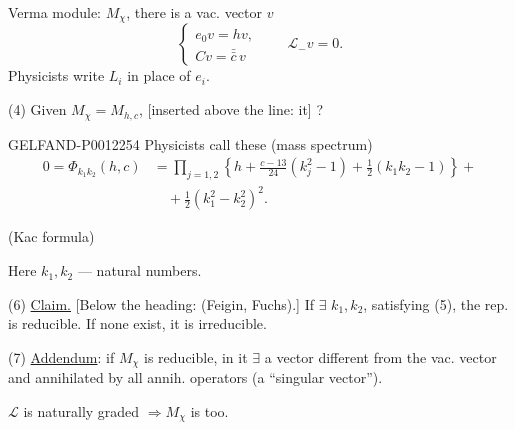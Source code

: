 Verma module: \(M_\chi\), there is a vac. vector \(v\)
\begin{equation*}
\begin{cases}
e_0v=hv,\\
Cv=\bar{\bar{c}}\,v
\end{cases}
\qquad\mathcal L_-v=0.\tag{3}
\end{equation*}
Physicists write \(L_i\) in place of \(e_i\).

(4) Given \(M_\chi=M_{h,c}\),  [inserted above the line: it]
?

\begin{GelfandAdjacentEvidence}{GELFAND-P001225}{4}
Physicists call these  (mass spectrum)
\begin{equation*}
\begin{aligned}
0=\Phi_{k_1k_2}(h,c)
&=\prod_{j=1,2}\left\{h+\frac{c-13}{24}(k_j^2-1)+\frac12(k_1k_2-1)\right\}+\\
&\quad+\frac12(k_1^2-k_2^2)^2.
\end{aligned}\tag{5}
\end{equation*}
\end{GelfandAdjacentEvidence}


(Kac formula)

Here \(k_1,k_2\) --- natural numbers.

(6) \underline{Claim.} [Below the heading: (Feigin, Fuchs).]
If \(\exists\) \(k_1,k_2\), satisfying (5), the rep. is reducible. If none exist, it is irreducible.

(7) \underline{Addendum}: if \(M_\chi\) is reducible, in it
\(\exists\) a vector different from the vac. vector and annihilated by all annih. operators (a “singular vector”).

\(\mathcal L\) is naturally graded \(\Rightarrow M_\chi\) is too.


